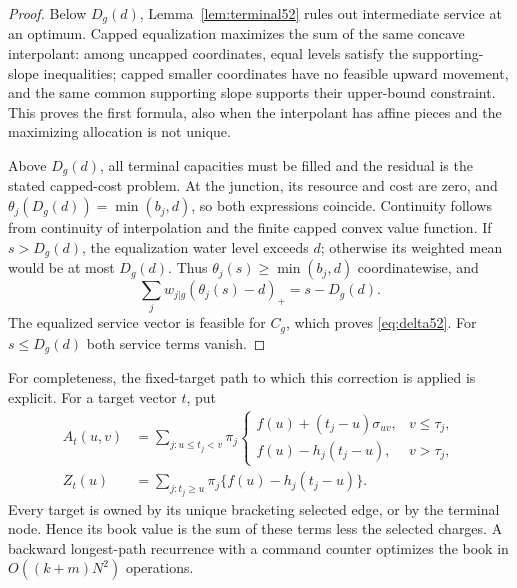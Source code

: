 \begin{proof}
Below $D_g(d)$, Lemma~\ref{lem:terminal52} rules out intermediate service at an optimum. Capped equalization maximizes the sum of the same concave interpolant: among uncapped coordinates, equal levels satisfy the supporting-slope inequalities; capped smaller coordinates have no feasible upward movement, and the same common supporting slope supports their upper-bound constraint. This proves the first formula, also when the interpolant has affine pieces and the maximizing allocation is not unique.

Above $D_g(d)$, all terminal capacities must be filled and the residual is the stated capped-cost problem. At the junction, its resource and cost are zero, and $\theta_j(D_g(d))=\min(b_j,d)$, so both expressions coincide. Continuity follows from continuity of interpolation and the finite capped convex value function. If $s>D_g(d)$, the equalization water level exceeds $d$; otherwise its weighted mean would be at most $D_g(d)$. Thus $\theta_j(s)\geq\min(b_j,d)$ coordinatewise, and
\[
 \sum_jw_{j|g}(\theta_j(s)-d)_+=s-D_g(d).
\]
The equalized service vector is feasible for $C_g$, which proves \eqref{eq:delta52}. For $s\leq D_g(d)$ both service terms vanish.
\end{proof}

For completeness, the fixed-target path to which this correction is applied is explicit. For a target vector $t$, put
\begin{align*}
 A_t(u,v)&=\sum_{j:u\leq t_j<v}\pi_j
 \begin{cases}
 f(u)+(t_j-u)\sigma_{uv},&v\leq\tau_j,\\
 f(u)-h_j(t_j-u),&v>\tau_j,
 \end{cases}\\
 Z_t(u)&=\sum_{j:t_j\geq u}\pi_j\{f(u)-h_j(t_j-u)\}.
\end{align*}
Every target is owned by its unique bracketing selected edge, or by the terminal node. Hence its book value is the sum of these terms less the selected charges. A backward longest-path recurrence with a command counter optimizes the book in $O((k+m)N^2)$ operations.

